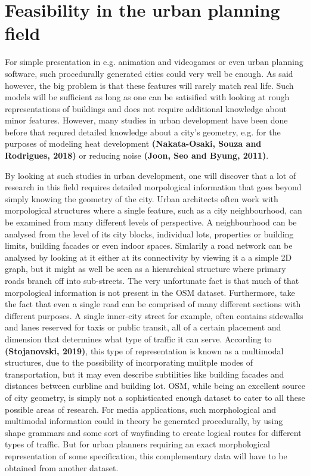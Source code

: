 \documentclass{kththesis}
\begin{document}
\section{Feasibility in the urban planning field}

For simple presentation in e.g. animation and videogames or even urban planning software, such procedurally generated cities could very well be enough.
As said however, the big problem is that these features will rarely match real life.
Such models will be sufficient as long as one can be satisified with looking at rough representations of buildings and does not require additional knowledge about minor features.
However, many studies in urban development have been done before that requred detailed knowledge about a city's geometry, e.g. for the purposes of modeling heat development
\textbf{(Nakata-Osaki, Souza and Rodrigues, 2018)}
or reducing noise
\textbf{(Joon, Seo and Byung, 2011)}.

By looking at such studies in urban development, one will discover that a lot of research in this field requires detailed morpological information that goes beyond simply knowing the geometry of the city.
Urban architects often work with morpological structures where a single feature, such as a city neighbourhood, can be examined from many different levels of perspective.
A neighbourhood can be analysed from the level of its city blocks, individual lots, properties or building limits, building facades or even indoor spaces.
Simlarily a road network can be analysed by looking at it either at its connectivity by viewing it a a simple 2D graph, but it might as well be seen as a hierarchical structure where primary roads branch off into sub-streets. 
The very unfortunate fact is that much of that morpological information is not present in the OSM dataset.
Furthermore, take the fact that even a single road can be comprised of many different sections with different purposes.
A single inner-city street for example, often contains sidewalks and lanes reserved for taxis or public transit, all of a certain placement and dimension that determines what type of traffic it can serve.
According to \textbf{(Stojanovski, 2019)}, this type of representation is known as a multimodal structures, due to the possibility of incorporating mulitple modes of transportation, but it may even describe subtilities like building facades and distances between curbline and building lot.
OSM, while being an excellent source of city geometry, is simply not a sophisticated enough dataset to cater to all these possible areas of research.
For media applications, such morphological and multimodal information could in theory be generated procedurally, by using shape grammars and some sort of wayfinding to create logical routes for different types of traffic.
But for urban planners requiring an exact morphological representation of some specification, this complementary data will have to be obtained from another dataset.
\end{document}
